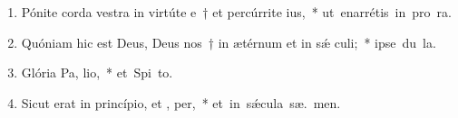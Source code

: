 \begin{flushleft}
\begin{enumerate}[leftmargin=*]
\item Pónite corda vestra in virtúte e~† et percúrrite  ius,~* \mbox{ut enarrétis in pro ra.}

\item Quóniam hic est Deus, Deus nos~† in ætérnum et in s\'{\ae} culi;~* \mbox{ipse du la.}

\item Glória Pa,  lio,~* \mbox{et Spi to.}

\item Sicut erat in princípio, et ,  per,~* \mbox{et in s\'{\ae}cula sæ. men.}

\end{enumerate}
\end{flushleft}

